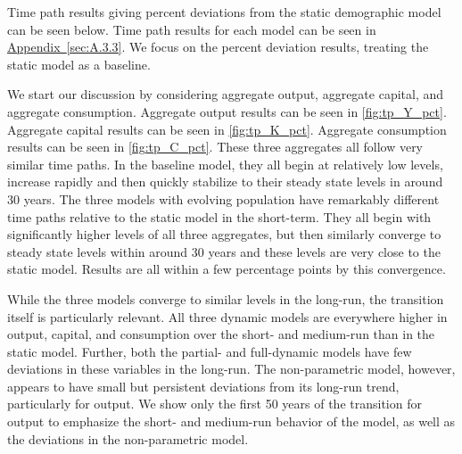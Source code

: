 \documentclass[10pt]{article}
\renewcommand{\thesection}{\arabic{section}}
\renewcommand{\thesubsection}{\thesection.\arabic{subsection}}
\newcommand{\aref}[1]{\hyperref[#1]{Appendix~\ref{#1}}}
\renewcommand{\section}[2][]{\oldsection[#1]{#2}\index{#1}\label{sec:\thesection}}
\renewcommand{\subsection}[2][]{\oldsubsection[#1]{#2}\index{#1}\label{sec:\thesubsection}}
\numberwithin{equation}{subsection}
\begin{document}


\subsection{Time Path}
\par Time path results giving percent deviations from the static demographic model can be seen below. Time path results for each model can be seen in \aref{sec:A.3.3}. We focus on the percent deviation results, treating the static model as a baseline.

\par We start our discussion by considering aggregate output, aggregate capital, and aggregate consumption. Aggregate output results can be seen in \autoref{fig:tp_Y_pct}. Aggregate capital results can be seen in \autoref{fig:tp_K_pct}. Aggregate consumption results can be seen in \autoref{fig:tp_C_pct}. These three aggregates all follow very similar time paths. In the baseline model, they all begin at relatively low levels, increase rapidly and then quickly stabilize to their steady state levels in around 30 years. The three models with evolving population have remarkably different time paths relative to the static model in the short-term. They all begin with significantly higher levels of all three aggregates, but then similarly converge to steady state levels within around 30 years and these levels are very close to the static model. Results are all within a few percentage points by this convergence.

\par While the three models converge to similar levels in the long-run, the transition itself is particularly relevant. All three dynamic models are everywhere higher in output, capital, and consumption over the short- and medium-run than in the static model. Further, both the partial- and full-dynamic models have few deviations in these variables in the long-run. The non-parametric model, however, appears to have small but persistent deviations from its long-run trend, particularly for output. We show only the first 50 years of the transition for output to emphasize the short- and medium-run behavior of the model, as well as the deviations in the non-parametric model.
\end{document}
